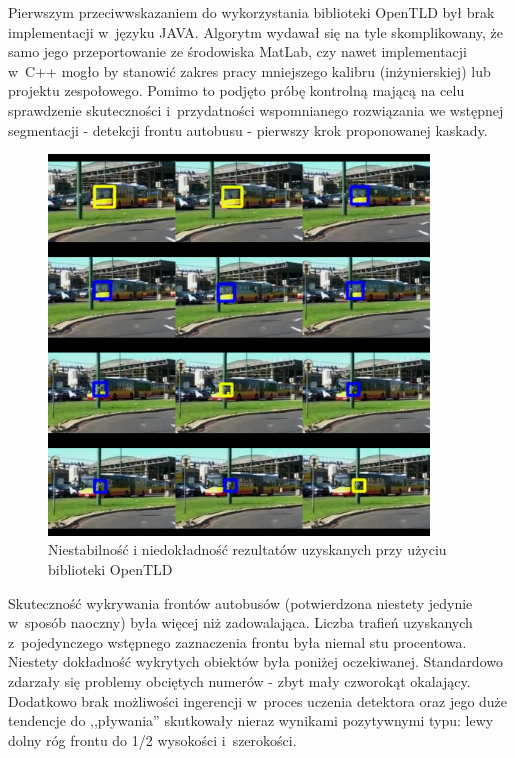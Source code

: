 Pierwszym przeciwwskazaniem do wykorzystania biblioteki OpenTLD 
był brak implementacji w~języku JAVA. Algorytm wydawał się na tyle
skomplikowany, że samo jego przeportowanie ze środowiska MatLab,
czy nawet implementacji w~C++ mogło by stanowić zakres pracy
mniejszego kalibru (inżynierskiej) lub projektu zespołowego.
Pomimo to podjęto próbę kontrolną mającą na celu sprawdzenie
skuteczności i~przydatności wspomnianego rozwiązania we wstępnej 
segmentacji - detekcji frontu autobusu - 
pierwszy krok proponowanej kaskady.

\begin{figure}[h!]
    \centering
    \includegraphics[width=0.9\textwidth]{img/exp_open_tld_fail}
    \caption{Niestabilność i niedokładność rezultatów uzyskanych przy
    użyciu biblioteki OpenTLD}
    \label{fig:opentld_bus_front_fail}
\end{figure}

Skuteczność wykrywania frontów autobusów (potwierdzona 
niestety jedynie w~sposób naoczny) była więcej niż zadowalająca.
Liczba trafień uzyskanych z~pojedynczego wstępnego zaznaczenia frontu
była niemal stu procentowa. Niestety dokładność wykrytych obiektów
była poniżej oczekiwanej. Standardowo zdarzały się problemy
obciętych numerów - zbyt mały czworokąt okalający. Dodatkowo
brak możliwości ingerencji w~proces uczenia detektora oraz jego
duże tendencje do ,,pływania'' skutkowały nieraz wynikami pozytywnymi
typu: lewy dolny róg frontu do 1/2 wysokości i~szerokości. 

